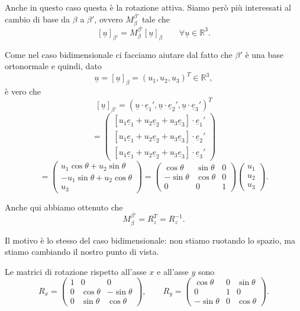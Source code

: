 Anche in questo caso questa è la rotazione attiva. Siamo però più interessati al cambio di base da $\beta$ a $\beta'$, ovvero $M_{\beta}^{\beta'}$ tale che
\[
[\underline{u}]_{\beta'}
=
M_{\beta}^{\beta'}[\underline{u}]_{\beta}
\qquad
\forall \underline{u}\in\mathbb{R}^3.
\]

Come nel caso bidimensionale ci facciamo aiutare dal fatto che $\beta'$ è una base ortonormale e quindi, dato
\[
\underline{u}
=
[\underline{u}]_{\beta}
=
(u_1,u_2,u_3)^T
\in \mathbb{R}^3,
\]
è vero che
\[
[\underline{u}]_{\beta'}
=
\left(
\underline{u}\cdot \underline{e}_1',
\underline{u}\cdot \underline{e}_2',
\underline{u}\cdot \underline{e}_3'
\right)^T
\]
\[
=
\begin{pmatrix}
\left[u_1\underline{e}_1+u_2\underline{e}_2+u_3\underline{e}_3\right]\cdot \underline{e}_1'
\\[4pt]
\left[u_1\underline{e}_1+u_2\underline{e}_2+u_3\underline{e}_3\right]\cdot \underline{e}_2'
\\[4pt]
\left[u_1\underline{e}_1+u_2\underline{e}_2+u_3\underline{e}_3\right]\cdot \underline{e}_3'
\end{pmatrix}
\]
\[
=
\begin{pmatrix}
u_1\cos\theta+u_2\sin\theta
\\
-u_1\sin\theta+u_2\cos\theta
\\
u_3
\end{pmatrix}
=
\begin{pmatrix}
\cos\theta & \sin\theta & 0
\\
-\sin\theta & \cos\theta & 0
\\
0 & 0 & 1
\end{pmatrix}
\begin{pmatrix}
u_1\\
u_2\\
u_3
\end{pmatrix}.
\]

Anche qui abbiamo ottenuto che
\[
M_{\beta}^{\beta'}
=
R_z^T
=
R_z^{-1}.
\]

Il motivo è lo stesso del caso bidimensionale: non stiamo ruotando lo spazio, ma stiamo cambiando il nostro punto di vista.

Le matrici di rotazione rispetto all'asse $x$ e all'asse $y$ sono
\[
R_x
=
\begin{pmatrix}
1 & 0 & 0
\\
0 & \cos\theta & -\sin\theta
\\
0 & \sin\theta & \cos\theta
\end{pmatrix},
\qquad
R_y
=
\begin{pmatrix}
\cos\theta & 0 & \sin\theta
\\
0 & 1 & 0
\\
-\sin\theta & 0 & \cos\theta
\end{pmatrix}.
\]

